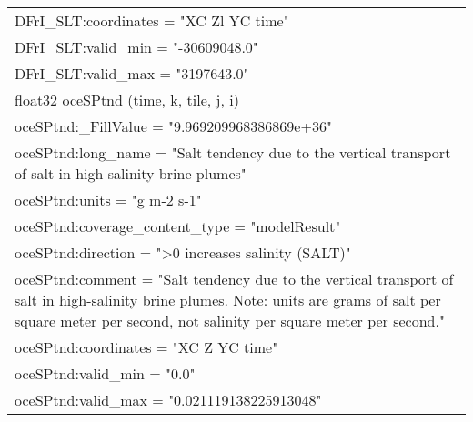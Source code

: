 \begin{longtable}{|p{\textwidth}|}
\hspace{0.5cm}\hspace{0.5cm}DFrI\_SLT:coordinates = "XC Zl YC time"\\
\hspace{0.5cm}\hspace{0.5cm}DFrI\_SLT:valid\_min = "-30609048.0"\\
\hspace{0.5cm}\hspace{0.5cm}DFrI\_SLT:valid\_max = "3197643.0"\\
\hspace{0.5cm}float32 oceSPtnd (time, k, tile, j, i)\\
\hspace{0.5cm}\hspace{0.5cm}oceSPtnd:\_FillValue = "9.969209968386869e+36"\\
\hspace{0.5cm}\hspace{0.5cm}oceSPtnd:long\_name = "Salt tendency due to the vertical transport of salt in high-salinity brine plumes"\\
\hspace{0.5cm}\hspace{0.5cm}oceSPtnd:units = "g m-2 s-1"\\
\hspace{0.5cm}\hspace{0.5cm}oceSPtnd:coverage\_content\_type = "modelResult"\\
\hspace{0.5cm}\hspace{0.5cm}oceSPtnd:direction = ">0 increases salinity (SALT)"\\
\hspace{0.5cm}\hspace{0.5cm}oceSPtnd:comment = "Salt tendency due to the vertical transport of salt in high-salinity brine plumes. Note: units are grams of salt per square meter per second, not salinity per square meter per second."\\
\hspace{0.5cm}\hspace{0.5cm}oceSPtnd:coordinates = "XC Z YC time"\\
\hspace{0.5cm}\hspace{0.5cm}oceSPtnd:valid\_min = "0.0"\\
\hspace{0.5cm}\hspace{0.5cm}oceSPtnd:valid\_max = "0.021119138225913048"\\
\hline
\end{longtable}